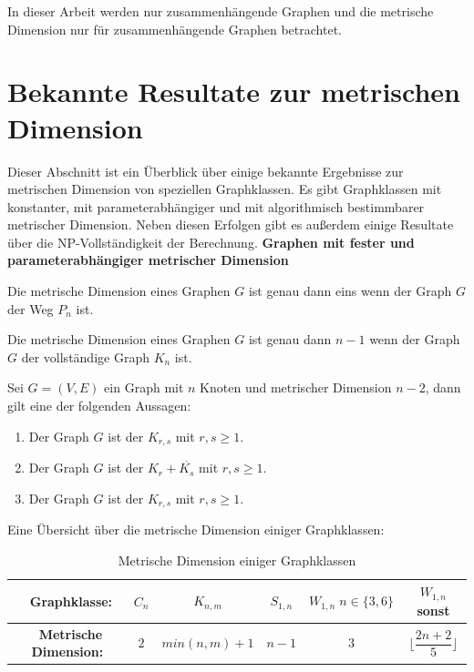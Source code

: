 \begin{bem}
In dieser Arbeit werden nur zusammenhängende Graphen und die metrische Dimension nur für zusammenhängende Graphen betrachtet.
\end{bem}
\newpage
\section{Bekannte Resultate zur metrischen Dimension}
\vspace{-2mm}
Dieser Abschnitt ist ein Überblick über einige bekannte Ergebnisse zur metrischen Dimension von speziellen Graphklassen. Es gibt Graphklassen mit konstanter, mit parameterabhängiger und mit algorithmisch bestimmbarer metrischer Dimension.\newline
Neben diesen Erfolgen gibt es außerdem einige Resultate über die NP-Vollständigkeit der Berechnung.\newline\newline
{\textbf{Graphen mit fester und parameterabhängiger metrischer Dimension}}
\begin{lem}
\label{path}\cite{landmarks}
Die metrische Dimension eines Graphen $G$ ist genau dann eins wenn der Graph $G$ der Weg $P_n$ ist.
\end{lem}
\begin{lem}
\label{complete}\cite{upper}
Die metrische Dimension eines Graphen $G$ ist genau dann $n-1$ wenn der Graph $G$ der vollständige Graph $K_n$ ist.
\end{lem}
\begin{lem}\cite{upper}
Sei $G = (V, E)$ ein Graph mit $n$ Knoten und metrischer Dimension $n-2$, dann gilt eine der folgenden Aussagen:
\begin{enumerate}
\item Der Graph $G$ ist der $K_{r,s}$ mit $r,s \geq 1$.
\item Der Graph $G$ ist der $K_{r}+ \overline{K_s}$ mit $r,s \geq 1$.
\item Der Graph $G$ ist der $K_{r,s}$ mit $r,s \geq 1$.
\end{enumerate}
\end{lem}
Eine Übersicht über die metrische Dimension einiger Graphklassen:
  \begin{table}[htb]
     \centering
     \begin{tabularx}{\textwidth}{|c|c|c|c|c|c|}
     	\hline  
       \parbox[c][4em][c]{0pt}{~}\textbf{Graphklasse:} & $C_n$&$K_{n,m}$&$S_{1,n}$&$W_{1,n}\;n \in \{3,6\}$&$W_{1,n}$ sonst \\[1em]
		\hline       
       \parbox[c][4em][c]{0pt}{~}\textbf{Metrische Dimension:}& $2$&$min(n,m)+1$& $n-1$  &$3$  &$\lfloor \dfrac{2n+2}{5} \rfloor$        \\[1em]
       	\hline  
     \end{tabularx}
 
     \caption{Metrische Dimension einiger Graphklassen}
     \label{tbl:Metrische Dimension einiger Graphklassen}
   \end{table}
